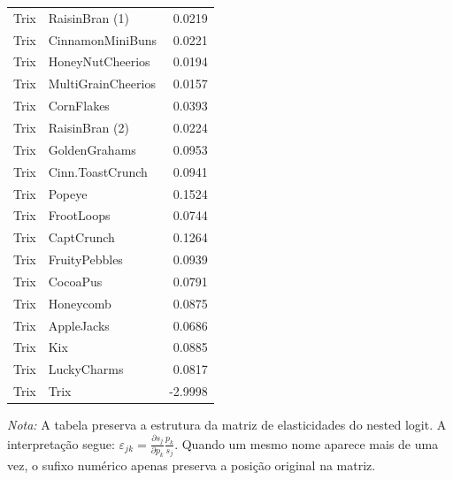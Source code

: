 \begin{table}[H]
\begin{tabular}{llr}
Trix & RaisinBran (1) & 0.0219 \\
Trix & CinnamonMiniBuns & 0.0221 \\
Trix & HoneyNutCheerios & 0.0194 \\
Trix & MultiGrainCheerios & 0.0157 \\
Trix & CornFlakes & 0.0393 \\
Trix & RaisinBran (2) & 0.0224 \\
Trix & GoldenGrahams & 0.0953 \\
Trix & Cinn.ToastCrunch & 0.0941 \\
Trix & Popeye & 0.1524 \\
Trix & FrootLoops & 0.0744 \\
Trix & CaptCrunch & 0.1264 \\
Trix & FruityPebbles & 0.0939 \\
Trix & CocoaPus & 0.0791 \\
Trix & Honeycomb & 0.0875 \\
Trix & AppleJacks & 0.0686 \\
Trix & Kix & 0.0885 \\
Trix & LuckyCharms & 0.0817 \\
Trix & Trix & -2.9998 \\
\bottomrule
\end{tabular}

\vspace{0.3em}
\footnotesize
\textit{Nota:} A tabela preserva a estrutura da matriz de elasticidades do nested logit. A interpretação segue: $\varepsilon_{jk}=\frac{\partial s_j}{\partial p_k}\frac{p_k}{s_j}$. Quando um mesmo nome aparece mais de uma vez, o sufixo numérico apenas preserva a posição original na matriz.
\end{table}
\endgroup
